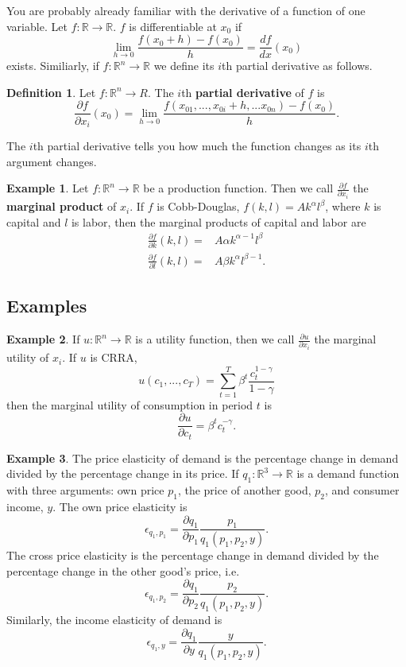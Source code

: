 \documentclass[12pt,reqno]{amsart}
\theoremstyle{definition}
\newtheorem{definition}{Definition}[section]
\newtheorem{example}{Example}[section]
\def\R{\mathbb{R}}
\renewcommand{\to}{{\rightarrow}}
\begin{document}
You are probably already familiar with the derivative of a function of
one variable. Let $f: \R \to \R$. $f$ is differentiable at $x_0$ if 
\[ \lim_{h \to 0} \frac{f(x_0 + h) - f(x_0)}{h} = \frac{d
  f}{dx}(x_0) \]
exists. Similiarly, if $f: \R^n \to \R$ we define its $i$th partial
derivative as follows.
\begin{definition}
  Let $f:\R^n \to R$. The $i$th \textbf{partial derivative} of $f$ is 
  \[ \frac{\partial f}{\partial x_i} (x_0) = \lim_{h \to 0}
  \frac{f(x_{01},...,x_{0i}+h, ... x_{0n}) - f(x_0) }{h}. \]
\end{definition}
The $i$th partial derivative tells you how much the function changes
as its $i$th argument changes.
\begin{example}
  Let $f:\R^n \to \R$ be a production function. Then we call
  $\frac{\partial f}{\partial x_i}$ the \textbf{marginal product} of
  $x_i$. If $f$ is Cobb-Douglas, $f(k,l) = Ak^\alpha l^\beta$, where
  $k$ is capital and $l$ is labor, then the marginal products of
  capital and labor are
  \begin{align*}
    \frac{\partial f}{\partial k} (k,l) = & A \alpha k^{\alpha-1}
    l^\beta \\
    \frac{\partial f}{\partial l} (k,l) = & A \beta k^{\alpha}
    l^{\beta -1}.
  \end{align*}
\end{example}

\subsection{Examples}
\begin{example}
  If $u:\R^n \to \R$ is a utility function, then we call
  $\frac{\partial u}{\partial x_i}$ the marginal utility of $x_i$.  
  If $u$ is CRRA, 
  \[u(c_1,...,c_T) =
  \sum_{t=1}^T \beta^t \frac{c_t^{1-\gamma}}{1-\gamma} \]
  then  the marginal utility of consumption in period $t$ is 
  \[ \frac{\partial u}{\partial c_t} = \beta^t c_t^{-\gamma}. \]
\end{example}

\begin{example}
  The price elasticity of demand is the percentage change in demand
  divided by the percentage change in its price. If $q_1:\R^3 \to \R$ is
  a demand function with three arguments: own price $p_1$, the price
  of another good, $p_2$, and consumer income, $y$.  The own price
  elasticity is 
  \[ \epsilon_{q_1,p_1} = \frac{\partial q_1}{\partial p_1}
  \frac{p_1}{q_1(p_1,p_2,y)}. \]
  The cross price elasticity is the percentage change in demand
  divided by the percentage change in the other good's price, i.e.
  \[ \epsilon_{q_1,p_2} = \frac{\partial q_1}{\partial p_2}
  \frac{p_2}{q_1(p_1,p_2,y)}. \]
  Similarly, the income elasticity of demand is
  \[ \epsilon_{q_1,y} = \frac{\partial q_1}{\partial y}
  \frac{y}{q_1(p_1,p_2,y)}. \]
\end{example}
\end{document}
